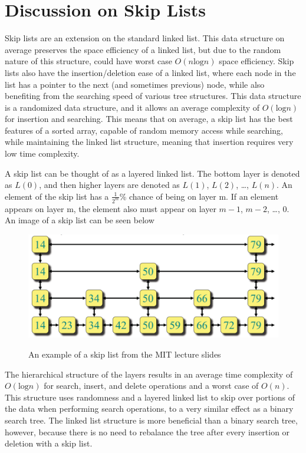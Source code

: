 \documentclass{article}
\begin{document}
\pagebreak

\section*{Discussion on Skip Lists}

Skip lists are an extension on the standard linked list. This data structure on average preserves the space efficiency of a linked list, but due to the random nature of this structure, could have worst case $O(n \text{log} n)$ space efficiency. Skip lists also have the insertion/deletion ease of a linked list, where each node in the list has a pointer to the next (and sometimes previous) node, while also benefiting from the searching speed of various tree structures. This data structure is a randomized data structure, and it allows an average complexity of $O(\text{log} n)$ for insertion and searching. This means that on average, a skip list has the best features of a sorted array, capable of random memory access while searching, while maintaining the linked list structure, meaning that insertion requires very low time complexity. 

A skip list can be thought of as a layered linked list. The bottom layer is denoted as $L(0)$, and then higher layers are denoted as $L(1)$, $L(2)$, \ldots, $L(n)$. An element of the skip list has a $\frac{1}{2^m}$\% chance of being on layer m. If an element appears on layer m, the element also must appear on layer $m-1$, $m-2$, \ldots, $0$. An image of a skip list can be seen below

\begin{figure}[h]
    \centering
    \includegraphics[width=\textwidth,keepaspectratio]{Images/SkipList_MIT.PNG}
    \label{fig:my_label}
    \caption{An example of a skip list from the MIT lecture slides}
\end{figure}

The hierarchical structure of the layers results in an average time complexity of $O(\text{log} n)$ for search, insert, and delete operations and a worst case of $O(n)$. This structure uses randomness and a layered linked list to skip over portions of the data when performing search operations, to a very similar effect as a binary search tree. The linked list structure is more beneficial than a binary search tree, however, because there is no need to rebalance the tree after every insertion or deletion with a skip list.
\end{document}
